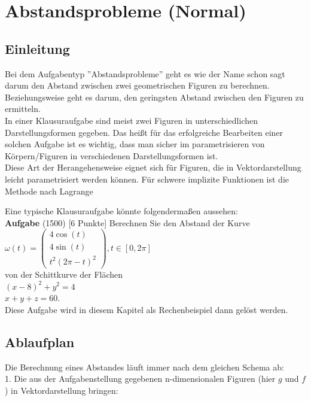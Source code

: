 \documentclass[11pt,final]{scrreprt}
\newcommand{\br} {\medskip\\}
\begin{document}
\chapter{Abstandsprobleme (Normal)}

\section{Einleitung}
Bei dem Aufgabentyp ''Abstandsprobleme'' geht es wie der Name schon sagt darum den Abstand zwischen zwei geometrischen Figuren zu berechnen.\\
Beziehungsweise geht es darum, den geringsten Abstand zwischen den Figuren zu ermitteln.\\
In einer Klausuraufgabe sind meist zwei Figuren in unterschiedlichen Darstellungsformen gegeben. Das heißt für das erfolgreiche Bearbeiten einer solchen Aufgabe ist es wichtig, dass man sicher im parametrisieren von Körpern/Figuren in verschiedenen Darstellungsformen ist.\\
Diese Art der Herangehensweise eignet sich für Figuren, die in Vektordarstellung leicht parametrisiert werden können. Für schwere implizite Funktionen ist die Methode nach Lagrange 

Eine typische Klausuraufgabe könnte folgendermaßen aussehen:\\

\textbf{Aufgabe} (1500) [6 Punkte] Berechnen Sie den Abstand der Kurve\br
$ \omega(t)=\left(\begin{matrix}
4\cos(t)\\ 
4\sin(t)\\ 
t^2(2\pi-t)^2
\end{matrix}\right), t\in[0, 2\pi] $\br
von der Schittkurve der Flächen\\

$ (x-8)^2+y^2=4 $\\
$ x+y+z = 60 $.\\

Diese Aufgabe wird in diesem Kapitel als Rechenbeispiel dann gelöst werden.\\

\section{Ablaufplan}
Die Berechnung eines Abstandes läuft immer nach dem gleichen Schema ab:\\

1. Die aus der Aufgabenstellung gegebenen n-dimensionalen Figuren (hier $g$ und $f$) in Vektordarstellung bringen:\\
\end{document}
